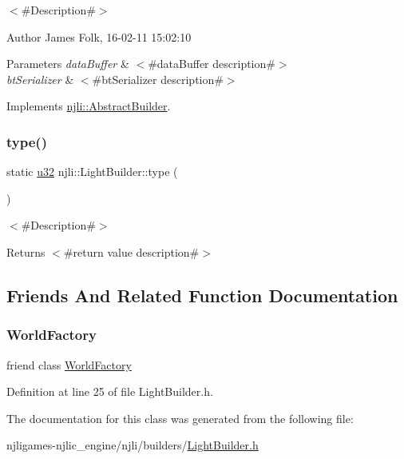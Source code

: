 $<$\#\+Description\#$>$ 

\begin{DoxyAuthor}{Author}
James Folk, 16-\/02-\/11 15\+:02\+:10
\end{DoxyAuthor}

\begin{DoxyParams}{Parameters}
{\em data\+Buffer} & $<$\#data\+Buffer description\#$>$ \\
\hline
{\em bt\+Serializer} & $<$\#bt\+Serializer description\#$>$ \\
\hline
\end{DoxyParams}


Implements \mbox{\hyperlink{classnjli_1_1_abstract_builder_ab66b774e02ccb9da554c9aab7fa6d981}{njli\+::\+Abstract\+Builder}}.

\mbox{\label{classnjli_1_1_light_builder_ab116d38f46899e9ede12dd63a24a9096}} 
\subsubsection{\texorpdfstring{type()}{type()}}
{\footnotesize\ttfamily static \mbox{\hyperlink{_util_8h_a10e94b422ef0c20dcdec20d31a1f5049}{u32}} njli\+::\+Light\+Builder\+::type (\begin{DoxyParamCaption}{ }\end{DoxyParamCaption})\hspace{0.3cm}{\ttfamily [static]}}

$<$\#\+Description\#$>$

\begin{DoxyReturn}{Returns}
$<$\#return value description\#$>$ 
\end{DoxyReturn}


\subsection{Friends And Related Function Documentation}
\mbox{\label{classnjli_1_1_light_builder_acb96ebb09abe8f2a37a915a842babfac}} 
\subsubsection{\texorpdfstring{World\+Factory}{WorldFactory}}
{\footnotesize\ttfamily friend class \mbox{\hyperlink{classnjli_1_1_world_factory}{World\+Factory}}\hspace{0.3cm}{\ttfamily [friend]}}



Definition at line 25 of file Light\+Builder.\+h.



The documentation for this class was generated from the following file\+:\begin{DoxyCompactItemize}
\item 
njligames-\/njlic\+\_\+engine/njli/builders/\mbox{\hyperlink{_light_builder_8h}{Light\+Builder.\+h}}\end{DoxyCompactItemize}
